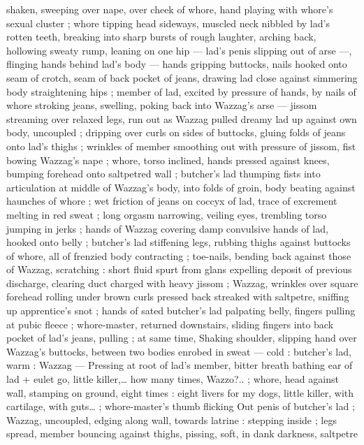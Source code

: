 shaken, sweeping over nape, over cheek of whore, hand playing with 
whore's sexual cluster ; whore tipping head sideways, muscled neck 
nibbled by lad's rotten teeth, breaking into sharp bursts of rough 
laughter, arching back, hollowing sweaty rump, leaning on one hip --- 
lad's penis slipping out of arse ---, flinging hands behind lad's body 
--- hands gripping buttocks, nails hooked onto seam of crotch, seam 
of back pocket of jeans, drawing lad close against simmering body 
straightening hips ; member of lad, excited by pressure of hands, by 
nails of whore stroking jeans, swelling, poking back into Wazzag's 
arse --- jissom streaming over relaxed legs, run out as Wazzag pulled 
dreamy lad up against own body, uncoupled ; dripping over curls on 
sides of buttocks, gluing folds of jeans onto lad's thighs ; wrinkles 
of member smoothing out with pressure of jissom, fist bowing 
Wazzag's nape ; whore, torso inclined, hands pressed against knees, 
bumping forehead onto saltpetred wall ; butcher's lad thumping fists 
into articulation at middle of Wazzag's body, into folds of groin, body 
beating against haunches of whore ; wet friction of jeans on coccyx 
of lad, trace of excrement melting in red sweat ; long orgasm 
narrowing, veiling eyes, trembling torso jumping in jerks ; hands of 
Wazzag covering damp convulsive hands of lad, hooked onto belly ; 
butcher's lad stiffening legs, rubbing thighs against buttocks of 
whore, all of frenzied body contracting ; toe-nails, bending back 
against those of Wazzag, scratching : short fluid spurt from glans 
expelling deposit of previous discharge, clearing duct charged with 
heavy jissom ; Wazzag, wrinkles over square forehead rolling under 
brown curls pressed back streaked with saltpetre, sniffing up 
apprentice's snot ; hands of sated butcher's lad palpating belly, 
fingers pulling at pubic fleece ; whore-master, returned downstairs, 
sliding fingers into back pocket of lad's jeans, pulling ; at same time, 
Shaking shoulder, slipping hand over Wazzag's buttocks, between 
two bodies enrobed in sweat --- cold : butcher's lad, warm : Wazzag 
--- Pressing at root of lad's member, bitter breath bathing ear of lad 
+ eulet go, little killer,{\ldots} how many times, Wazzo?..{\gr} ; whore, head 
against wall, stamping on ground, eight times :{\td} {\gl} eight livers for my 
dogs, little killer, with cartilage, with guts{\ldots} {\gr} ; whore-master's thumb 
flicking Out penis of butcher's lad ; Wazzag, uncoupled, edging along 
wall, towards latrine : stepping inside ; legs spread, member 
bouncing against thighs, pissing, soft, in dank darkness, saltpetre 
